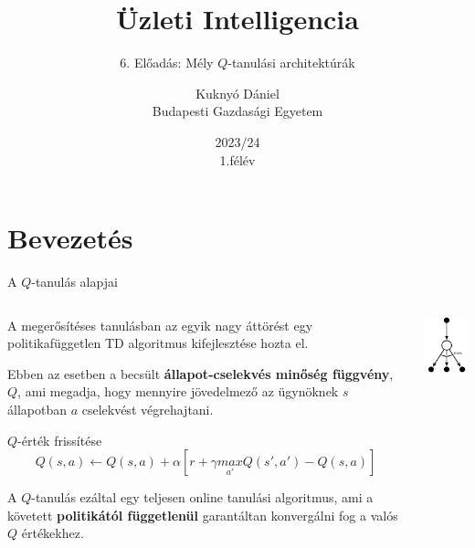 \documentclass[english, aspectratio=169]{beamer}
\makeatletter
\newcommand\makebeamertitle{\frame{\maketitle}}
\let\origtableofcontents=\tableofcontents
\def\tableofcontents{\@ifnextchar[{\origtableofcontents}{\gobbletableofcontents}}
\def\gobbletableofcontents#1{\origtableofcontents}
\makeatother
\begin{document}
\section{Bevezetés}
\title[]{Üzleti Intelligencia}
\subtitle{6. Előadás: Mély $Q$-tanulási architektúrák}
\author[Kuknyó Dániel]{Kuknyó Dániel\\Budapesti Gazdasági Egyetem}
\date{2023/24\\1.félév}
\makebeamertitle

\begin{frame}
\tableofcontents{}
\end{frame}

\begin{frame}
\tableofcontents[currentsection]
\end{frame}

\begin{frame}{A $Q$-tanulás alapjai}
\begin{columns}
\begin{column}{.75\textwidth}
A megerősítéses tanulásban az egyik nagy áttörést egy politikafüggetlen TD algoritmus kifejlesztése hozta el.\par\smallskip
Ebben az esetben a becsült \textbf{állapot-cselekvés minőség függvény}, $Q$, ami megadja, hogy mennyire jövedelmező az ügynöknek $s$ állapotban $a$ cselekvést végrehajtani.
\begin{block}{$Q$-érték frissítése}
\[
Q(s,a) \leftarrow Q(s,a) + \alpha \left[ r + \gamma \underset{a'}{max}Q(s',a') - Q(s,a) \right]
\]
\end{block}
A $Q$-tanulás ezáltal egy teljesen online tanulási algoritmus, ami a követett \textbf{politikától függetlenül} garantáltan konvergálni fog a valós $Q$ értékekhez.
\end{column}
\begin{column}{.25\textwidth}
\begin{center}
\includegraphics[width=3cm, keepaspectratio]{../../5_ql/doc/images/ql_2.png}
\end{center}
\end{column}
\end{columns}
\end{frame}
\end{document}
